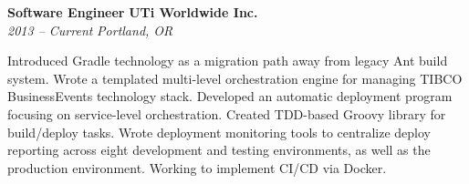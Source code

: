 	\item
	\headerrow
		{\textbf{Software Engineer}}
		{\textbf{UTi Worldwide Inc.}}
	\\
	\headerrow
		{\emph{2013 -- Current}}
		{\emph{Portland, OR}}
	\begin{itemize*}
    \item Introduced Gradle technology as a migration path away from legacy Ant build system. Wrote a templated multi-level orchestration engine for managing TIBCO BusinessEvents technology stack. Developed an automatic deployment program focusing on service-level orchestration. Created TDD-based Groovy library for build/deploy tasks. Wrote deployment monitoring tools to centralize deploy reporting across eight development and testing environments, as well as the production environment. Working to implement CI/CD via Docker.
	\end{itemize*}
